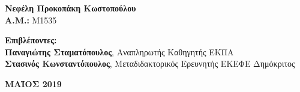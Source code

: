 \begin{titlepage}
\begin{center}
		\vspace{1.5cm}
		\textbf{Νεφέλη Προκοπάκη Κωστοπούλου}\\
		\textbf{Α.Μ.: } Μ1535
		
		\vspace{1.5cm}
		\textbf{Επιβλέποντες:}\\
		\textbf{Παναγιώτης Σταματόπουλος}, Αναπληρωτής Καθηγητής ΕΚΠΑ\\
		\textbf{Στασινός Κωνσταντόπουλος}, Μεταδιδακτορικός Ερευνητής ΕΚΕΦΕ Δημόκριτος
		
		\vfill
		
		\vspace{0.8cm}
		\textbf{ΜΑΪΟΣ 2019}
		\thispagestyle{empty}
	\end{center}
\end{titlepage}
